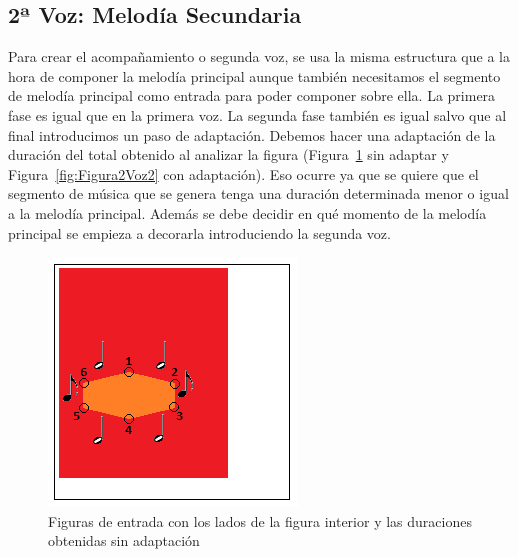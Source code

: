 
\subsection{2ª Voz: Melodía Secundaria}

Para crear el acompañamiento o segunda voz, se usa la misma estructura que a la hora de componer la melodía principal aunque también necesitamos el segmento de melodía principal como entrada para poder componer sobre ella. 
La primera fase es igual que en la primera voz. La segunda fase también es igual salvo que al final introducimos un paso de adaptación. Debemos hacer una adaptación de la duración del total obtenido al analizar la figura (Figura~\ref{fig:Figura1Voz2} sin adaptar y Figura~\ref{fig:Figura2Voz2} con adaptación). Eso ocurre ya que se quiere que el segmento de música que se genera tenga una duración determinada menor o igual a la melodía principal. Además se debe decidir en qué momento de la melodía principal se empieza a decorarla introduciendo la segunda voz.

 		\begin{figure}[htbp]
		\centering
		\hspace*{0.0in}
		\includegraphics[scale=1]{graphics/simpletest4-F2.png}
		\caption{Figuras de entrada con los lados de la figura interior y las duraciones obtenidas sin adaptación}
		\label{fig:Figura1Voz2}
		\end{figure}

